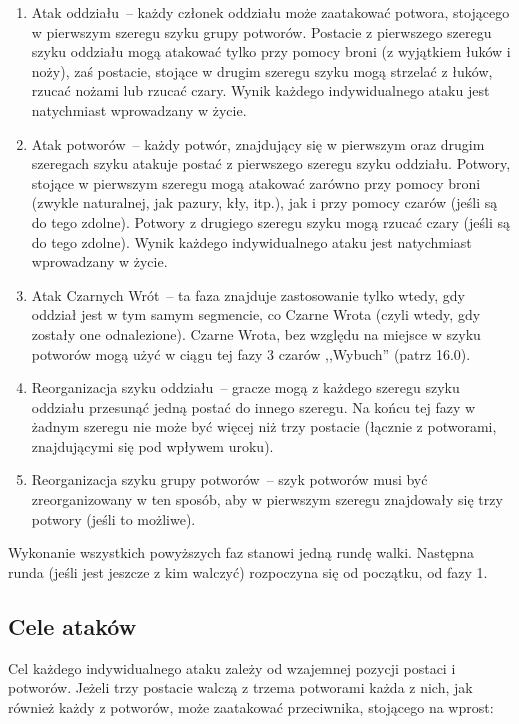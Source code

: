\begin{enumerate}
    \item Atak oddziału~-- każdy członek oddziału może zaatakować potwora, stojącego w pierwszym szeregu szyku grupy potworów.
        Postacie z pierwszego szeregu szyku oddziału mogą atakować tylko przy pomocy broni (z wyjątkiem łuków i noży), zaś postacie, stojące w drugim szeregu szyku mogą strzelać z łuków, rzucać nożami lub rzucać czary.
        Wynik każdego indywidualnego ataku jest natychmiast wprowadzany w życie.
    \item Atak potworów~-- każdy potwór, znajdujący się w pierwszym oraz drugim szeregach szyku atakuje postać z pierwszego szeregu szyku oddziału.
        Potwory, stojące w pierwszym szeregu mogą atakować zarówno przy pomocy broni (zwykle naturalnej, jak pazury, kły, itp.), jak i przy pomocy czarów (jeśli są do tego zdolne).
        Potwory z drugiego szeregu szyku mogą rzucać czary (jeśli są do tego zdolne).
        Wynik każdego indywidualnego ataku jest natychmiast wprowadzany w życie.
    \item Atak Czarnych Wrót~-- ta faza znajduje zastosowanie tylko wtedy, gdy oddział jest w tym samym segmencie, co Czarne Wrota (czyli wtedy, gdy zostały one odnalezione).
        Czarne Wrota, bez względu na miejsce w szyku potworów mogą użyć w ciągu tej fazy 3 czarów ,,Wybuch'' (patrz 16.0).
    \item Reorganizacja szyku oddziału~-- gracze mogą z każdego szeregu szyku oddziału przesunąć jedną postać do innego szeregu.
        Na końcu tej fazy w żadnym szeregu nie może być więcej niż trzy postacie (łącznie z potworami, znajdującymi się pod wpływem uroku).
    \item
        Reorganizacja szyku grupy potworów~-- szyk potworów musi być zreorganizowany w ten sposób, aby w pierwszym szeregu znajdowały się trzy potwory (jeśli to możliwe).
\end{enumerate}

Wykonanie wszystkich powyższych faz stanowi jedną rundę walki.
Następna runda (jeśli jest jeszcze z kim walczyć) rozpoczyna się od początku, od fazy 1.

\subsection{Cele ataków}

Cel każdego indywidualnego ataku zależy od wzajemnej pozycji postaci i potworów.
Jeżeli trzy postacie walczą z trzema potworami każda z nich, jak również każdy z potworów, może zaatakować przeciwnika, stojącego na wprost:

